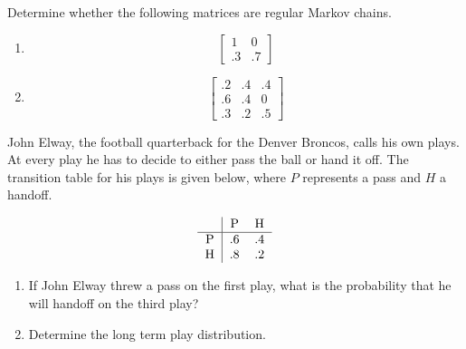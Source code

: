 \begin{puzzle}
    Determine whether the following matrices are regular Markov chains.

    \begin{enumerate}
        \item \[
                  \begin{bmatrix}
                      1  & 0  \\
                      .3 & .7
                  \end{bmatrix}
              \]
        \item \[
                  \begin{bmatrix}
                      .2 & .4 & .4 \\
                      .6 & .4 & 0  \\
                      .3 & .2 & .5
                  \end{bmatrix}
              \]
    \end{enumerate}
\end{puzzle}

\begin{puzzle}
    John Elway, the football quarterback for the Denver Broncos, calls his own plays. At every play he has to decide to either pass the ball or hand it off. The transition table for his plays is given below, where \(P\) represents a pass and \(H\) a handoff.

    \[
        \begin{tabular}{c|cc}
              & P  & H  \\
            \hline
            P & .6 & .4 \\
            H & .8 & .2 \\
        \end{tabular}
    \]

    \begin{enumerate}
        \item If John Elway threw a pass on the first play, what is the probability that he will handoff on the third play?
        \item Determine the long term play distribution.
    \end{enumerate}
\end{puzzle}


